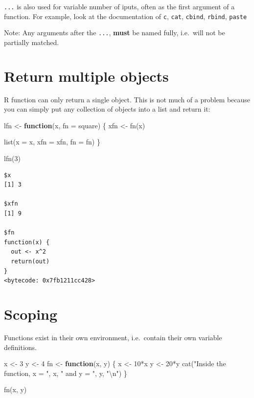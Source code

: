 \documentclass[
]{book}
\newenvironment{Shaded}{\begin{snugshade}}{\end{snugshade}}
\newcommand{\AttributeTok}[1]{\textcolor[rgb]{0.77,0.63,0.00}{#1}}
\newcommand{\ControlFlowTok}[1]{\textcolor[rgb]{0.13,0.29,0.53}{\textbf{#1}}}
\newcommand{\DecValTok}[1]{\textcolor[rgb]{0.00,0.00,0.81}{#1}}
\newcommand{\FunctionTok}[1]{\textcolor[rgb]{0.00,0.00,0.00}{#1}}
\newcommand{\NormalTok}[1]{#1}
\newcommand{\OtherTok}[1]{\textcolor[rgb]{0.56,0.35,0.01}{#1}}
\newcommand{\SpecialCharTok}[1]{\textcolor[rgb]{0.00,0.00,0.00}{#1}}
\newcommand{\StringTok}[1]{\textcolor[rgb]{0.31,0.60,0.02}{#1}}
\begin{document}
\texttt{...} is also used for variable number of iputs, often as the first argument of a function. For example, look at the documentation of \texttt{c}, \texttt{cat}, \texttt{cbind}, \texttt{rbind}, \texttt{paste}

Note: Any arguments after the \texttt{...}, \textbf{must} be named fully, i.e.~will not be partially matched.

\hypertarget{return-multiple-objects}{%
\section{Return multiple objects}\label{return-multiple-objects}}

R function can only return a single object. This is not much of a problem because you can simply put any collection of objects into a list and return it:

\begin{Shaded}
\begin{Highlighting}[]
\NormalTok{lfn }\OtherTok{\textless{}{-}} \ControlFlowTok{function}\NormalTok{(x, }\AttributeTok{fn =}\NormalTok{ square) \{}
\NormalTok{  xfn }\OtherTok{\textless{}{-}} \FunctionTok{fn}\NormalTok{(x)}
  
  \FunctionTok{list}\NormalTok{(}\AttributeTok{x =}\NormalTok{ x,}
       \AttributeTok{xfn =}\NormalTok{ xfn,}
       \AttributeTok{fn =}\NormalTok{ fn)}
\NormalTok{\}}

\FunctionTok{lfn}\NormalTok{(}\DecValTok{3}\NormalTok{)}
\end{Highlighting}
\end{Shaded}

\begin{verbatim}
$x
[1] 3

$xfn
[1] 9

$fn
function(x) {
  out <- x^2
  return(out)
}
<bytecode: 0x7fb1211cc428>
\end{verbatim}

\hypertarget{scoping}{%
\section{Scoping}\label{scoping}}

Functions exist in their own environment, i.e.~contain their own variable definitions.

\begin{Shaded}
\begin{Highlighting}[]
\NormalTok{x }\OtherTok{\textless{}{-}} \DecValTok{3}
\NormalTok{y }\OtherTok{\textless{}{-}} \DecValTok{4}
\NormalTok{fn }\OtherTok{\textless{}{-}} \ControlFlowTok{function}\NormalTok{(x, y) \{}
\NormalTok{  x }\OtherTok{\textless{}{-}} \DecValTok{10}\SpecialCharTok{*}\NormalTok{x}
\NormalTok{  y }\OtherTok{\textless{}{-}} \DecValTok{20}\SpecialCharTok{*}\NormalTok{y}
  \FunctionTok{cat}\NormalTok{(}\StringTok{"Inside the function, x = "}\NormalTok{, x, }\StringTok{" and y = "}\NormalTok{, y, }\StringTok{"}\SpecialCharTok{\textbackslash{}n}\StringTok{"}\NormalTok{)}
\NormalTok{\}}

\FunctionTok{fn}\NormalTok{(x, y)}
\end{Highlighting}
\end{Shaded}
\end{document}
